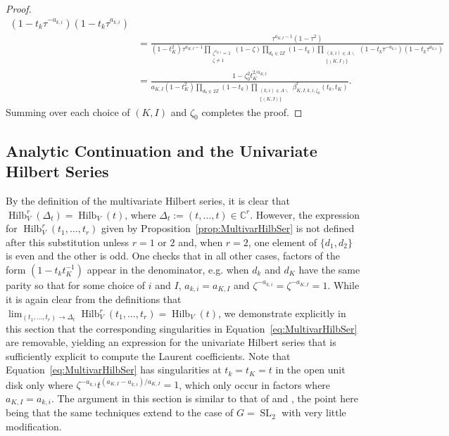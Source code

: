 \documentclass{amsart}
\theoremstyle{definition}
\theoremstyle{remark}
\newcommand{\C}{\mathbb{C}}
\newcommand{\Z}{\mathbb{Z}}
\newcommand{\SL}{\operatorname{SL}}
\newcommand{\Hilb}{\operatorname{Hilb}}
\begin{document}
\begin{proof}
\begin{align*}
{            (1 - t_k \tau^{-a_{k,i}})(1 - t_k \tau^{a_{k,i}}) }
    \\&=
    \frac{ \tau^{a_{K,I} - 1} (1 - \tau^2)}
    {(1 - t_K^2) \tau^{a_{K,I} - 1}
        \prod\limits_{\substack{\zeta^{a_{K,I}} = 1\\ \zeta\neq 1}} (1 - \zeta)
        \prod\limits_{d_k\in 2\Z}(1 - t_k) \prod\limits_{\substack{(k,i)\in\Lambda\smallsetminus \\ \{(K,I)\}}}
            (1 - t_k \tau^{-a_{k,i}})(1 - t_k \tau^{a_{k,i}}) }
    \\&=
    \frac{ 1 - \zeta_0^2 t_K^{2/a_{K,I}}}
    {a_{K,I}(1 - t_K^2) \prod\limits_{d_k\in 2\Z}(1 - t_k)
        \prod\limits_{\substack{(k,i)\in\Lambda\smallsetminus \\ \{(K,I)\}}}
            \beta_{K,I,k,i,\zeta_0}^r(t_k, t_K)
            }.
\end{align*}
Summing over each choice of $(K,I)$ and $\zeta_0$ completes the proof.
\end{proof}


\subsection{Analytic Continuation and the Univariate Hilbert Series}
\label{subsec:HilbSerAnalyticContin}


By the definition of the multivariate Hilbert series, it is clear that $\Hilb_V^r(\Delta_t) = \Hilb_V(t)$,
where $\Delta_t := (t,\ldots,t)\in \C^r$. However, the expression for $\Hilb_V^r(t_1,\ldots,t_r)$
given by Proposition~\ref{prop:MultivarHilbSer} is not defined after this substitution unless
$r = 1$ or $2$ and, when $r = 2$, one element of $\{d_1,d_2\}$ is even and the other is odd. One checks
that in all other cases, factors of the form $(1 - t_k t_K^{-1})$ appear in the denominator, e.g.
when $d_k$ and $d_K$ have the same parity so that for some choice of $i$ and $I$,
$a_{k,i} = a_{K,I}$ and $\zeta^{-a_{k,i}} = \zeta^{-a_{K,I}} = 1$. While it is again clear from the definitions that
$\lim_{(t_1,\ldots,t_r)\to\Delta_t} \Hilb_V^r(t_1,\ldots,t_r) = \Hilb_V(t)$,
we demonstrate explicitly in this section that the corresponding singularities in
Equation~\eqref{eq:MultivarHilbSer}
are removable, yielding an expression for the univariate Hilbert
series that is sufficiently explicit to compute the Laurent coefficients.
Note that Equation~\eqref{eq:MultivarHilbSer} has singularities at $t_k = t_K=t$ in the open unit disk
only where $\zeta^{-a_{k,i}} t^{(a_{K,I}-a_{k,i})/a_{K,I}} = 1$, which only occur in factors where $a_{K,I} = a_{k,i}$.
The argument in this section is similar to that of \cite[Section 3.3]{HerbigSeaton} and
\cite[Theorem 3.3]{CowieHerbigSeatonHerden}, the point here being that the same techniques extend
to the case of $G = \SL_2$ with very little modification.
\end{document}
